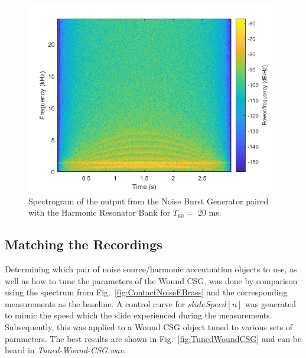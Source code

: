 \documentclass[../main.tex]{subfiles}
\begin{document}
\begin{figure}[h!]
    \centering
    \includegraphics[scale=.65]{./images/plots/NBG-HRB-T60-Long.png}
    \caption{Spectrogram of the output from the Noise Burst Generator paired with the Harmonic Resonator Bank for $T_{60} = $ 20 ms.}
    \label{fig:NBG_HRB_T60_Long}
\end{figure}


\subsection{Matching the Recordings}
Determining which pair of noise source/harmonic accentuation objects to use, as well as how to tune the parameters of the Wound CSG, was done by comparison using the spectrum from Fig.~\ref{fig:ContactNoiseEBrass} and the corresponding measurements as the baseline. A control curve for $slideSpeed[n]$ was generated to mimic the speed which the slide experienced during the measurements. Subsequently, this was applied to a Wound CSG object tuned to various sets of parameters. The best results are shown in Fig.~\ref{fig:TunedWoundCSG} and can be heard in \emph{Tuned-Wound-CSG.wav}.
\end{document}
